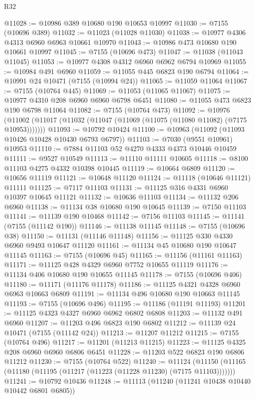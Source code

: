 \begin{lexlean}{R32}
\begin{coremodule}
@11028 := @10986 @389 @10680 @190 @10653 @10997
@11030 := @7155 (@10696 @389)
@11032 := @11023 (@11028 @11030)
@11038 := @10977 @4306 @4313 @6960 @6963 @10661 @10970
@11043 := @10986 @473 @10680 @190 @10661 @10997
@11045 := @7155 (@10696 @473)
@11047 := @11038 (@11043 @11045)
@11053 := @10977 @4308 @4312 @6960 @6962 @6794 @10969
@11055 := @10984 @491 @6960
@11059 := @11055 @445 @6823 @190 @6794
@11064 := @10991 @24 @10471 (@7155 (@10994 @24))
@11065 := @11059 @11064
@11067 := @7155 (@10764 @445)
@11069 := @11053 (@11065 @11067)
@11075 := @10977 @4310 @208 @6960 @6960 @6798 @6451
@11080 := @11055 @473 @6823 @190 @6798 @11064
@11082 := @7155 (@10764 @473)
@11092 := @10976
    (@11002 (@11017 (@11032 (@11047 (@11069 (@11075 (@11080 @11082) (@7175 @10953)))))))
@11093 := @10792 @10424
@11100 := @10963 (@11092 (@11093 @10426 @10428 @10430 @6793 @6797))
@11103 := @7030 (@9551 @10961) @10953
@11110 := @7884 @11103 @52 @4270 @4333 @4373 @10446 @10459
@11111 := @9527 @10549
@11113 := @11110 @11111 @10605
@11118 := @8100 @11103 @4275 @4332 @10398 @10445
@11119 := @10664 @6809
@11120 := @10656 @11119
@11121 := @10648 @11120
@11124 := @11118 (@10646 @11121) @11111
@11125 := @7117 @11103
@11131 := @11125 @316 @4331 @6960 @10397 @10645 @11121
@11132 := @10636 @11103
@11134 := @11132 @206 @6960
@11138 := @11134 @38 @10680 @190 @10645
@11139 := @7150 @11103
@11141 := @11139 @190 @10468
@11142 := @7156 @11103
@11145 := @11141 (@7155 (@11142 @190))
@11146 := @11138 @11145
@11148 := @7155 (@10696 @38)
@11150 := @11131 (@11146 @11148)
@11156 := @11125 @330 @4330 @6960 @9493 @10647 @11120
@11161 := @11134 @45 @10680 @190 @10647 @11145
@11163 := @7155 (@10696 @45)
@11165 := @11156 (@11161 @11163)
@11171 := @11125 @428 @4329 @6960 @7752 @10655 @11119
@11176 := @11134 @406 @10680 @190 @10655 @11145
@11178 := @7155 (@10696 @406)
@11180 := @11171 (@11176 @11178)
@11186 := @11125 @4321 @4328 @6960 @6963 @10663 @6809
@11191 := @11134 @496 @10680 @190 @10663 @11145
@11193 := @7155 (@10696 @496)
@11195 := @11186 (@11191 @11193)
@11201 := @11125 @4323 @4327 @6960 @6962 @6802 @6808
@11203 := @11132 @491 @6960
@11207 := @11203 @496 @6823 @190 @6802
@11212 := @11139 @24 @10471 (@7155 (@11142 @24))
@11213 := @11207 @11212
@11215 := @7155 (@10764 @496)
@11217 := @11201 (@11213 @11215)
@11223 := @11125 @4325 @208 @6960 @6960 @6806 @6451
@11228 := @11203 @522 @6823 @190 @6806 @11212
@11230 := @7155 (@10764 @522)
@11240 := @11124
    (@11150 (@11165 (@11180 (@11195 (@11217 (@11223 (@11228 @11230) (@7175 @11103)))))))
@11241 := @10792 @10436
@11248 := @11113 (@11240 (@11241 @10438 @10440 @10442 @6801 @6805))

\end{coremodule}
\end{lexlean}
